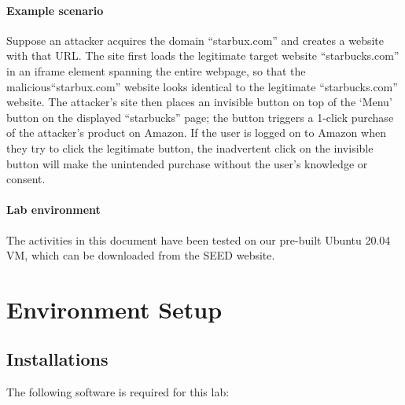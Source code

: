 \paragraph{Example scenario} Suppose an attacker acquires the domain
``starbux.com'' and creates a website with that URL. The site first
loads the legitimate target website ``starbucks.com'' in an iframe
element spanning the entire webpage, so that the
malicious``starbux.com'' website looks identical to the legitimate
``starbucks.com'' website.  The attacker's site then places an invisible
button on top of the `Menu' button on the displayed ``starbucks'' page;
the button triggers a 1-click purchase of the attacker's product on
Amazon.  If the user is logged on to Amazon when they try to click the
legitimate button, the inadvertent click on the invisible button will
make the unintended purchase without the user's knowledge or consent.

\paragraph{Lab environment} The activities in this document have been
tested on our pre-built Ubuntu 20.04 VM, which can be downloaded from
the SEED website.  



\section{Environment Setup}


\subsection{Installations}
The following software is required for this lab:

